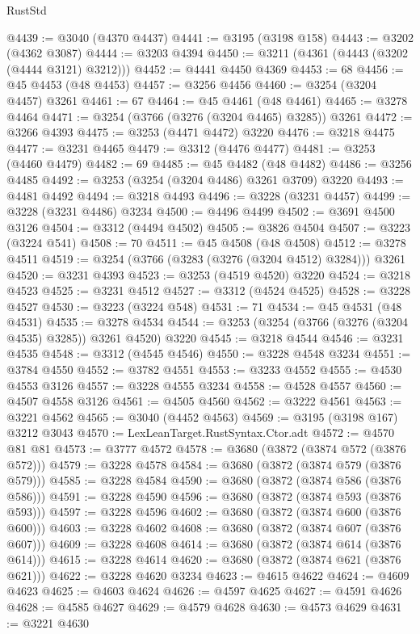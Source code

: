 \begin{lexlean}{RustStd}
\begin{coremodule}
@4439 := @3040 (@4370 @4437)
@4441 := @3195 (@3198 @158)
@4443 := @3202 (@4362 @3087)
@4444 := @3203 @4394
@4450 := @3211 (@4361 (@4443 (@3202 (@4444 @3121) @3212)))
@4452 := @4441 @4450 @4369
@4453 := 68
@4456 := @45 @4453 (@48 @4453)
@4457 := @3256 @4456
@4460 := @3254 (@3204 @4457) @3261
@4461 := 67
@4464 := @45 @4461 (@48 @4461)
@4465 := @3278 @4464
@4471 := @3254 (@3766 (@3276 (@3204 @4465) @3285)) @3261
@4472 := @3266 @4393
@4475 := @3253 (@4471 @4472) @3220
@4476 := @3218 @4475
@4477 := @3231 @4465
@4479 := @3312 (@4476 @4477)
@4481 := @3253 (@4460 @4479)
@4482 := 69
@4485 := @45 @4482 (@48 @4482)
@4486 := @3256 @4485
@4492 := @3253 (@3254 (@3204 @4486) @3261 @3709) @3220
@4493 := @4481 @4492
@4494 := @3218 @4493
@4496 := @3228 (@3231 @4457)
@4499 := @3228 (@3231 @4486) @3234
@4500 := @4496 @4499
@4502 := @3691 @4500 @3126
@4504 := @3312 (@4494 @4502)
@4505 := @3826 @4504
@4507 := @3223 (@3224 @541)
@4508 := 70
@4511 := @45 @4508 (@48 @4508)
@4512 := @3278 @4511
@4519 := @3254 (@3766 (@3283 (@3276 (@3204 @4512) @3284))) @3261
@4520 := @3231 @4393
@4523 := @3253 (@4519 @4520) @3220
@4524 := @3218 @4523
@4525 := @3231 @4512
@4527 := @3312 (@4524 @4525)
@4528 := @3228 @4527
@4530 := @3223 (@3224 @548)
@4531 := 71
@4534 := @45 @4531 (@48 @4531)
@4535 := @3278 @4534
@4544 := @3253 (@3254 (@3766 (@3276 (@3204 @4535) @3285)) @3261 @4520) @3220
@4545 := @3218 @4544
@4546 := @3231 @4535
@4548 := @3312 (@4545 @4546)
@4550 := @3228 @4548 @3234
@4551 := @3784 @4550
@4552 := @3782 @4551
@4553 := @3233 @4552
@4555 := @4530 @4553 @3126
@4557 := @3228 @4555 @3234
@4558 := @4528 @4557
@4560 := @4507 @4558 @3126
@4561 := @4505 @4560
@4562 := @3222 @4561
@4563 := @3221 @4562
@4565 := @3040 (@4452 @4563)
@4569 := @3195 (@3198 @167) @3212 @3043
@4570 := LexLeanTarget.RustSyntax.Ctor.adt
@4572 := @4570 @81 @81
@4573 := @3777 @4572
@4578 := @3680 (@3872 (@3874 @572 (@3876 @572)))
@4579 := @3228 @4578
@4584 := @3680 (@3872 (@3874 @579 (@3876 @579)))
@4585 := @3228 @4584
@4590 := @3680 (@3872 (@3874 @586 (@3876 @586)))
@4591 := @3228 @4590
@4596 := @3680 (@3872 (@3874 @593 (@3876 @593)))
@4597 := @3228 @4596
@4602 := @3680 (@3872 (@3874 @600 (@3876 @600)))
@4603 := @3228 @4602
@4608 := @3680 (@3872 (@3874 @607 (@3876 @607)))
@4609 := @3228 @4608
@4614 := @3680 (@3872 (@3874 @614 (@3876 @614)))
@4615 := @3228 @4614
@4620 := @3680 (@3872 (@3874 @621 (@3876 @621)))
@4622 := @3228 @4620 @3234
@4623 := @4615 @4622
@4624 := @4609 @4623
@4625 := @4603 @4624
@4626 := @4597 @4625
@4627 := @4591 @4626
@4628 := @4585 @4627
@4629 := @4579 @4628
@4630 := @4573 @4629
@4631 := @3221 @4630

\end{coremodule}
\end{lexlean}
